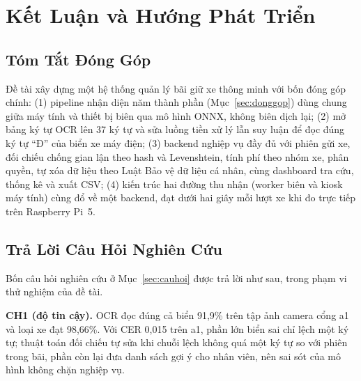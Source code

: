 \chapter{Kết Luận và Hướng Phát Triển}
\label{ch:ketluan}

\section{Tóm Tắt Đóng Góp}

Đề tài xây dựng một hệ thống quản lý bãi giữ xe thông minh với bốn đóng góp chính: (1)
pipeline nhận diện năm thành phần (Mục~\ref{sec:donggop}) dùng chung giữa máy tính và thiết
bị biên qua mô hình ONNX, không biên dịch lại; (2) mở bảng ký tự
OCR lên 37 ký tự và sửa luồng tiền xử lý lẫn suy luận để đọc đúng ký tự ``Đ'' của biển xe
máy điện; (3) backend nghiệp vụ đầy đủ với phiên gửi xe, đối chiếu chống gian lận theo hash
và Levenshtein, tính phí theo nhóm xe, phân quyền, tự xóa dữ liệu theo Luật Bảo vệ dữ liệu
cá nhân, cùng dashboard tra cứu, thống kê và xuất CSV; (4) kiến trúc hai đường thu nhận
(worker biên và kiosk máy tính) cùng đổ về một backend, đạt dưới hai giây mỗi lượt xe khi đo
trực tiếp trên Raspberry Pi~5.

\section{Trả Lời Câu Hỏi Nghiên Cứu}

Bốn câu hỏi nghiên cứu ở Mục~\ref{sec:cauhoi} được trả lời như sau, trong phạm vi thử nghiệm
của đề tài.

\textbf{CH1 (độ tin cậy).} OCR đọc đúng cả biển 91,9\% trên tập ảnh camera cổng a1 và loại xe
đạt 98,66\%. Với CER 0,015 trên a1, phần lớn biển sai chỉ lệch một ký tự; thuật toán đối
chiếu tự sửa khi chuỗi lệch không quá một ký tự so với phiên trong bãi, phần còn lại đưa danh
sách gợi ý cho nhân viên, nên sai sót của mô hình không chặn nghiệp vụ.


